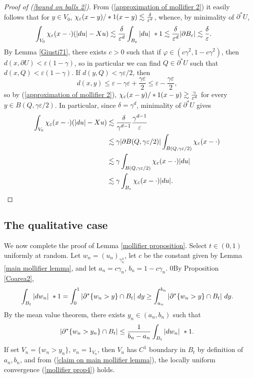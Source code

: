 \begin{proof}[Proof of (\ref{bound on balls 2})]
From (\ref{approximation of mollifier 2}) it easily follows that for $y \in V_0$, $\chi_\varepsilon(x - y)/*1(x - y) \lesssim \frac{\delta}{\varepsilon^d}$,
whence, by minimality of $\partial^* U$,
\begin{align*}
\int_{V_0} \chi_\varepsilon(x - \cdot)(|du| - Xu) &\lesssim \frac{\delta}{\varepsilon^d} \int_{B_\varepsilon} |du| ~*1 \lesssim \frac{\delta}{\varepsilon^d} |\partial B_\varepsilon| \lesssim \frac{\delta}{\varepsilon}.
\end{align*}
By Lemma \ref{Giusti71}, there exists $c > 0$ such that if $\varphi \in (c\gamma^2, 1 - c\gamma^2)$, then $d(x, \partial U) < \varepsilon(1 - \gamma)$, so in particular we can find $Q \in \partial^* U$ such that $d(x, Q) < \varepsilon(1 - \gamma)$.
If $d(y, Q) < \gamma\varepsilon/2$, then
$$d(x, y) \leq \varepsilon - \gamma\varepsilon + \frac{\gamma\varepsilon}{2} \leq \varepsilon - \frac{\gamma\varepsilon}{2},$$
so by (\ref{approximation of mollifier 2}), $\chi_\varepsilon(x - y)/*1(x - y) \gtrsim \frac{\gamma}{\varepsilon^d}$
for every $y \in B(Q, \gamma\varepsilon/2)$.
In particular, since $\delta = \gamma^d$, minimality of $\partial^* U$ gives
\begin{align*}
\int_{V_0} \chi_\varepsilon(x - \cdot)(|du| - Xu) &\lesssim \frac{\delta}{\gamma^{d - 1}} \frac{\gamma^{d - 1}}{\varepsilon}\\
&\lesssim \gamma |\partial B(Q, \gamma\varepsilon/2)| \int_{B(Q, \gamma\varepsilon/2)} \chi_\varepsilon(x - \cdot) \\
&\lesssim \gamma \int_{B(Q, \gamma\varepsilon/2)} \chi_\varepsilon(x - \cdot) |du|\\
&\lesssim \gamma \int_{B_\varepsilon} \chi_\varepsilon(x - \cdot) |du|. \qedhere
\end{align*}
\end{proof}


\subsection{The qualitative case}
We now complete the proof of Lemma \ref{mollifier proposition}.
Select $t \in (0, 1)$ uniformly at random.
Let $w_n = (u_n)_{\gamma_n^4}$, let $c$ be the constant given by Lemma \ref{main mollifier lemma}, and let $a_n = c\gamma_n$, $b_n = 1 - c\gamma_n$.
0By Proposition \ref{Coarea2},
$$\int_{B_t} |dw_n| ~*1 = \int_0^1 |\partial^* \{w_n > y\} \cap B_t| ~dy \geq \int_{a_n}^{b_n} |\partial^* \{w_n > y\} \cap B_t| ~dy.$$
By the mean value theorem, there exists $y_n \in (a_n, b_n)$ such that
\begin{equation}\label{MVT mollifier}
|\partial^* \{w_n > y_n\} \cap B_t| \leq \frac{1}{b_n - a_n} \int_{B_t} |dw_n| ~*1.
\end{equation}
If set $V_n = \{w_n > y_n\}$, $v_n = 1_{V_n}$, then $V_n$ has $C^1$ boundary in $B_t$ by definition of $a_n, b_n$, and from (\ref{claim on main mollifier lemma}), the locally uniform convergence (\ref{mollifier prop4}) holds.

